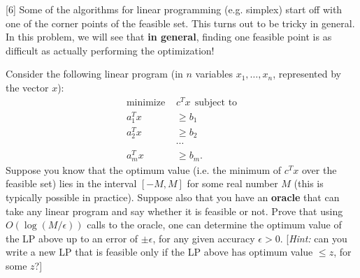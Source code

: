 \documentclass[addpoints, 11pt]{exam}
\begin{document}
\begin{questions}

[6]
Some of the algorithms for linear programming (e.g. simplex) start off with one of the corner points of the feasible set.  This turns out to be tricky in general. In this problem, we will see that {\bf in general}, finding one feasible point is as difficult as actually performing the optimization! 

Consider the following linear program (in $n$ variables $x_1, \dots, x_n$, represented by the vector $x$):
\begin{align*}
\text{minimize } &c^T x ~~\text{subject to} \\
a_1^T x &\ge b_1 \\
a_2^T x &\ge b_2 \\
&\cdots \\
a_m^T x &\ge b_m.
\end{align*}
Suppose you know that the optimum value (i.e. the minimum of $c^T x$ over the feasible set) lies in the interval $[-M, M]$ for some real number $M$ (this is typically possible in practice).  Suppose also that you have an {\bf oracle} that can take any linear program and say whether it is feasible or not.  Prove that using $O(\log (M/\epsilon))$ calls to the oracle, one can determine the optimum value of the LP above up to an error of $\pm \epsilon$, for any given accuracy $\epsilon > 0$.  [\emph{Hint: } can you write a new LP that is feasible only if the LP above has optimum value $\le z$, for some $z$?]

\end{questions}
\end{document}

